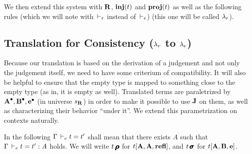 \documentclass[a4paper,english]{lipics-utf8x}
\begin{document}
  We then extend this system with $\operatorname{\mathbf{R}}$, $\operatorname{\mathbf{inj}}(t)$ and $\operatorname{\mathbf{proj}}(t)$ as well as
  the following rules (which we will note with $\,\vdash_r$ instead of $\,\vdash_e$)
  (this one will be called $\lambda_r$).

  \begin{mathc}
    \ru{\derr \Gamma
      }{\Gamma \derr \mR : \sB}
    \qquad
    \qquad
  \end{mathc}

  \begin{mathc}
    \qquad
  \end{mathc}


  \subsection{Translation for Consistency ($\lambda_r$ to $\lambda_e$)}

  Because our translation is based on the derivation of a judgement and not
  only the judgement itself, we need to have some criterium of compatibility.
  It will also be helpful to ensure that the empty type is mapped to something
  close to the empty type (as in, it is empty as well).
  Translated terms are paraletrized by $\operatorname{\operatorname{\mathbf{A}}^\bullet},\operatorname{\operatorname{\mathbf{B}}^\bullet},\operatorname{\operatorname{\mathbf{e}}^\bullet}$ (in universe $s_{\operatorname{\mathbf{R}}}$)
  in order to make it possible to use $\operatorname{\mathbf{J}}$ on them, as well as characterizing
  their behavior
  ``under it''. We extend this parametrization on contexts naturally.

  In the following $\Gamma \,\vdash_e t = t'$ shall mean that there exists $A$
  such that $\Gamma \,\vdash_e t = t' : A$ holds. We will write $t\operatorname{\pmb{\bm{\rho}}}$ for
  $t[\operatorname{\mathbf{A}},\operatorname{\mathbf{A}},\operatorname{\mathbf{refl}}]$, and $t\operatorname{\pmb{\bm{\sigma}}}$ for $t[\operatorname{\mathbf{A}},\operatorname{\mathbf{B}},\operatorname{\mathbf{e}}]$.
\end{document}
